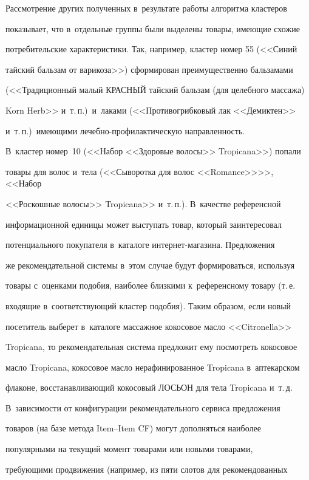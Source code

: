 

  


  Рассмотрение других полученных в~результате работы алгоритма кластеров 


показывает, что в~отдельные группы были выделены товары, имеющие схожие 


потребительские характеристики. Так, например, кластер номер 55 (<<Синий 


тайский бальзам от варикоза>>) сформирован преимущественно бальзамами 


(<<Традиционный малый КРАСНЫЙ тайский бальзам (для целебного массажа) 


Korn Herb>> и~т.\,п.)\ и~лаками (<<Противогрибковый лак <<Демиктен>> 


и~т.\,п.)\ име\-ющи\-ми ле\-чеб\-но-про\-фи\-лак\-ти\-че\-скую направленность. 


В~кластер номер~10 (<<Набор <<Здоровые волосы>> Tropicana>>) попали 


товары для волос и~тела (<<Сыворотка для волос <<Romance>>>>, <<Набор 


<<Роскошные волосы>> Tropicana>> и~т.\,п.). В~качестве референсной 


информационной единицы может выступать товар, который заинтересовал 


потенциального покупателя в~каталоге ин\-тер\-нет-ма\-га\-зи\-на. Предложения 


же рекомендательной системы в~этом случае будут формироваться, используя 


товары с~оценками подобия, наиболее близкими к~референсному товару (т.\,е.\ 


входящие в~соответствующий кластер подобия). Таким образом, если новый 


посетитель выберет в~каталоге массажное кокосовое масло <<Citronella>> 


Tropicana, то рекомендательная система предложит ему посмотреть кокосовое 


масло Tropicana, кокосовое масло нерафинированное Tropicana в~аптекарском 


флаконе, восстанавливающий кокосовый ЛОСЬОН для тела Tropicana и~т.\,д. 


В~зависимости от конфигурации рекомендательного сервиса предложения 


товаров (на базе метода Item--Item CF) могут дополняться наиболее 


популярными на текущий момент товарами или новыми товарами, 


требующими продвижения (например, из пяти слотов для рекомендованных 


